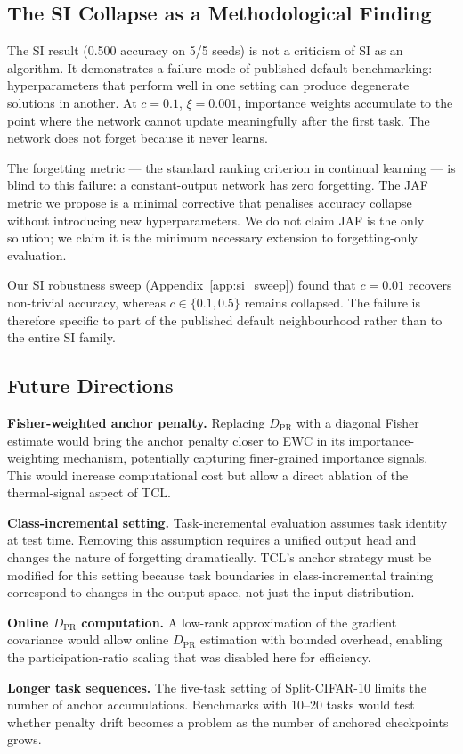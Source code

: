 \subsection{The SI Collapse as a Methodological Finding}

The SI result (0.500 accuracy on 5/5 seeds) is not a criticism of SI as an algorithm.
It demonstrates a failure mode of published-default benchmarking: hyperparameters that
perform well in one setting can produce degenerate solutions in another.
At $c = 0.1$, $\xi = 0.001$, importance weights accumulate to the point where the
network cannot update meaningfully after the first task.
The network does not forget because it never learns.

The forgetting metric --- the standard ranking criterion in continual learning ---
is blind to this failure: a constant-output network has zero forgetting.
The JAF metric we propose is a minimal corrective that penalises accuracy collapse
without introducing new hyperparameters.
We do not claim JAF is the only solution; we claim it is the minimum necessary
extension to forgetting-only evaluation.

Our SI robustness sweep (Appendix~\ref{app:si_sweep}) found that $c = 0.01$
recovers non-trivial accuracy, whereas $c \in \{0.1, 0.5\}$ remains collapsed.
The failure is therefore specific to part of the published default neighbourhood
rather than to the entire SI family.

\subsection{Future Directions}

\textbf{Fisher-weighted anchor penalty.}
Replacing $D_{\mathrm{PR}}$ with a diagonal Fisher estimate would bring the anchor
penalty closer to EWC in its importance-weighting mechanism, potentially capturing
finer-grained importance signals.
This would increase computational cost but allow a direct ablation of the
thermal-signal aspect of TCL.

\textbf{Class-incremental setting.}
Task-incremental evaluation assumes task identity at test time.
Removing this assumption requires a unified output head and changes the nature of
forgetting dramatically.
TCL's anchor strategy must be modified for this setting because task boundaries
in class-incremental training correspond to changes in the output space, not just
the input distribution.

\textbf{Online $D_{\mathrm{PR}}$ computation.}
A low-rank approximation of the gradient covariance would allow online $D_{\mathrm{PR}}$
estimation with bounded overhead, enabling the participation-ratio scaling that was
disabled here for efficiency.

\textbf{Longer task sequences.}
The five-task setting of Split-CIFAR-10 limits the number of anchor accumulations.
Benchmarks with 10--20 tasks would test whether penalty drift becomes a problem as
the number of anchored checkpoints grows.
